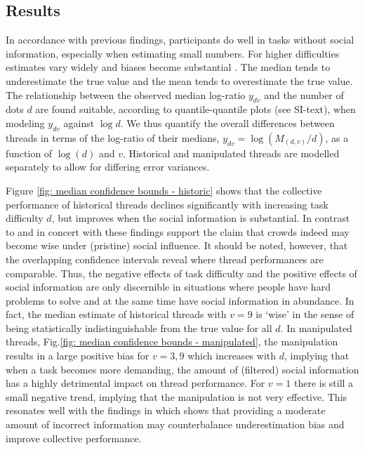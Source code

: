 \documentclass[9pt,a4paper,twocolumn,lineno]{article}
\begin{document}
\subsection*{Results}
In accordance with previous findings, participants do well in tasks without social information, especially when estimating small numbers. For higher difficulties estimates vary widely and biases become substantial \cite{indow1977scaling, izard2008calibrating, krueger1982single, krueger1984perceived, kao2018counteracting}. The median tends to underestimate the true value and the mean tends to overestimate the true value. %
The relationship between the observed median log-ratio $y_{dv}$ and the number of dots $d$ are found suitable, according to quantile-quantile plots (see SI-text), when modeling $y_{dv}$ against $\log{d}$. We thus quantify the overall differences between threads in terms of the log-ratio of their medians, $y_{dv}=\log(M_{(d,v)}/d)$, as a function of $\log(d)$ and $v$. Historical and manipulated threads are modelled separately to allow for differing error variances.

Figure \ref{fig: median confidence bounds - historic} shows that the collective performance of historical threads declines significantly with increasing task difficulty $d$, but improves when the social information is substantial. In contrast to \cite{lorenz2011social, king2011true, minson2012cost} and in concert with \cite{gurccay2015power, becker2017network, jayles2017social, farrell2011social} these findings support the claim that crowds indeed may become wise under (pristine) social influence. It should be noted, however, that the overlapping confidence intervals reveal where thread performances are comparable. Thus, the negative effects of task difficulty and the positive effects of social information are only discernible in situations where people have hard problems to solve and at the same time have social information in abundance. In fact, the median estimate of historical threads with $v=9$ is `wise' in the sense of being statistically indistinguishable from the true value for all $d$. In manipulated threads, Fig.\ref{fig: median confidence bounds - manipulated}, the manipulation results in a large positive bias for $v=3,9$ which increases with $d$, implying that when a task becomes more demanding, the amount of (filtered) social information has a highly detrimental impact on thread performance. For $v=1$ there is still a small negative trend, implying that the manipulation is not very effective. This resonates well with the findings in \cite{jayles2017social} which shows that providing a moderate amount of incorrect information may counterbalance underestimation bias and improve collective performance. 
\end{document}
